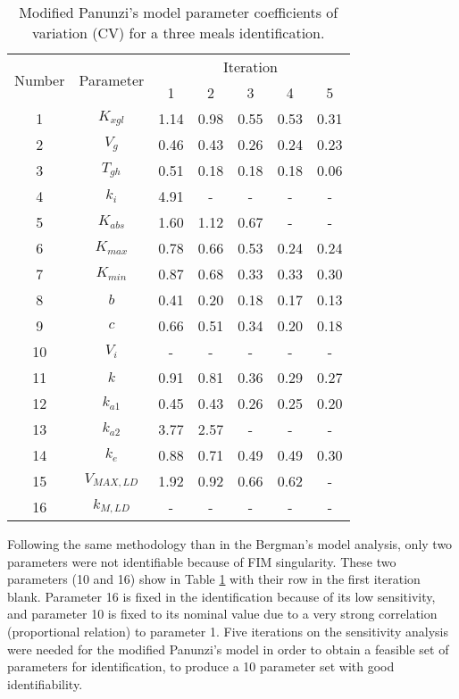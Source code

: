 \begin{table}[hbt]
	\centering
	\begin{tabular}{ c | c | c | c | c | c | c }
	\multirow{2}{*}{Number} & \multirow{2}{*}{Parameter} & \multicolumn{5}{c}{Iteration} \\
	& & 1 & 2 & 3 & 4 & 5 \\
	\hline 
	1 & $K_{xgl}$ & 1.14 & 0.98 & 0.55 & 0.53 & 0.31\\
	2 & $V_{g}$ & 0.46 & 0.43 & 0.26 & 0.24 & 0.23\\
	3 & $T_{gh}$ & 0.51 & 0.18 & 0.18 & 0.18 & 0.06\\
	4 & $k_{i}$ & 4.91 & - & - & - & -\\
	5 & $K_{abs}$ & 1.60 & 1.12 & 0.67 & - & -\\
	6 & $K_{max}$ & 0.78 & 0.66 & 0.53 & 0.24 & 0.24\\
	7 & $K_{min}$ & 0.87 & 0.68 & 0.33 & 0.33 & 0.30\\	
	8 & $b$ & 0.41 & 0.20 & 0.18 & 0.17 & 0.13\\
	9 & $c$ & 0.66 & 0.51 & 0.34 & 0.20 & 0.18\\
	10 & $V_i$ & - & - & - & - & -\\
	11 & $k$ & 0.91 & 0.81 & 0.36 & 0.29 & 0.27\\
	12 & $k_{a1}$ & 0.45 & 0.43 & 0.26 & 0.25 & 0.20\\
	13 & $k_{a2}$ & 3.77 & 2.57 & - & - & -\\
	14 & $k_{e}$ & 0.88 & 0.71 & 0.49 & 0.49 & 0.30\\
	15 & $V_{MAX,LD}$ & 1.92 & 0.92 & 0.66 & 0.62 & -\\
	16 & $k_{M,LD}$ & - & - & - & - & -\\	
	\end{tabular}
\caption{Modified Panunzi's model parameter coefficients of variation (CV) for a three meals identification.}
\label{tab:panunziCV}
\end{table}

Following the same methodology than in the Bergman's model analysis, only two parameters were not identifiable because of FIM singularity. These two parameters (10 and 16) show in Table \ref{tab:panunziCV} with their row in the first iteration blank. Parameter 16 is fixed in the identification because of its low sensitivity, and parameter 10 is fixed to its nominal value due to a very strong correlation (proportional relation) to parameter 1. Five iterations on the sensitivity analysis were needed for the modified Panunzi's model in order to obtain a feasible set of parameters for identification, to produce a 10 parameter set with good identifiability.

